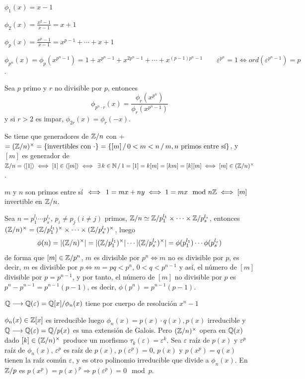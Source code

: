 \noindent$\phi_1(x) = x-1$

\noindent$\phi_2(x) = \frac{x^2-1}{x-1} = x+1$

\noindent$\phi_p(x) = \frac{x^p-1}{x-1} = x^{p-1} + \cdots  + x+ 1$

\noindent$\phi_{p^n}(x) = \phi_p(x^{p^n-1} ) = 1+x^{p^n-1} + x^{2p^n-1} + \cdots + x^{(p-1) p^n-1} \qquad \varepsilon^{p^n} = 1 \iff ord(\varepsilon^{p^n-1}) = p$.
\begin{ejer}
    Sea $p$ primo y $r$ no divisible por $p$, entonces 
    $$\phi_{p^n\cdot r}(x) = \frac{\phi_r(x^{p^n})}{\phi_r(x^{p^n-1})} $$
    y si $r>2$ es impar, $\phi_{2r}(x) = \phi_r(-x)$.
\end{ejer} 
Se tiene que generadores de $\mathbb{Z}/n$ con + $=(\mathbb{Z}/n)^{\times} = \{\text{invertibles con } \cdot\} = \{ [m] \, / \, 0 < m <n \, / \, m, n \text{ primos entre s\'i}\}$, y $[m]$ es generador de $\mathbb{Z}/n = \langle [1] \rangle \iff [1]\in \langle [m]\rangle \iff \, \exists\, k \in \mathbb{N} \, / \, 1=[1]=k[m]=[km]=[k][m]\iff [m] \in (\mathbb{Z}/n)^{\times}$.
\begin{lem}
    [de Bezout] $m$ y $n$ son primos entre s\'i $\iff \, 1=mx+ny \iff 1=mx \mod n\mathbb{Z} \iff [m]$ invertible en $\mathbb{Z}/n$.
\end{lem}
Sea $n = p_1^{l_1} \cdots p_s^{l_s}$, $p_i \neq p_j (i \neq j)$ primos, $\mathbb{Z}/n \simeq \mathbb{Z} /  p_1^{l_1} \times \cdots \times  \mathbb{Z}/p_s^{l_s}$, entonces $(\mathbb{Z} / n)^{\times} =(\mathbb{Z} /  p_1^{l_1}) ^{\times}\times \cdots \times  (\mathbb{Z}/p_s^{l_s})^{\times}$, luego
$$\phi(n) = |(\mathbb{Z} / n)^{\times}| =|(\mathbb{Z} /  p_1^{l_1}) ^{\times}|  \cdots |(\mathbb{Z}/p_s^{l_s})^{\times}| = \phi( p_1^{l_1}) \cdots  \phi(p_s^{l_s})$$
de forma que $[m]\in \mathbb{Z}/p^n$, $m$ es divisible por $p^n \iff m$ no es divisible por $p$, es decir, $m$ es divisible por $p\iff m = pq < p^n, \, 0< q< p^{n-1}$ y as\'i, el n\'umero de $[m]$ divisible por $p = p^{n-1}$, y por tanto, el n\'umero de $[m]$ no divisible por $p$ es $p^n-p^{n-1} = p^{n-1}(p-1)$, es decir, $\phi(p^n) = p^{n-1} (p-1)$. 
\begin{prop}
    $\mathbb{Q} \longrightarrow \mathbb{Q}(\varepsilon) = \mathbb{Q}[x] / \phi_n(x)$ tiene por cuerpo de resoluci\'on $x^n-1$
\end{prop}
\begin{dem}
    $\phi_n(x) \in \mathbb{Z}[x]$ es irreducible luego $\phi_n(x) = p(x)\cdot q(x), p(x)$ irreducible y $\mathbb{Q} \longrightarrow \mathbb{Q}(\varepsilon) = \mathbb{Q}/ p(x)$ es una extensi\'on de Galois. Pero $(\mathbb{Z}/n)^{\times}$ opera en $\mathbb{Q}(x)$ dado $[k]\in (\mathbb{Z}/n)^{\times}$ produce un morfismo $\tau_k (\varepsilon) = \varepsilon^k$. Sea $\varepsilon$ ra\'iz de $p(x)$ y $\varepsilon^p$ ra\'iz de $\phi_n(x)$, $\varepsilon^p$ es ra\'iz de $p(x)$, $p(\varepsilon^p)=0$, $p(x)$ y $p(x^p)=q(x)$ tienen la ra\'iz com\'un $\varepsilon$, y es otro polinomio irreducible que divide a $\phi_n(x)$. En $\mathbb{Z}/p$ es $p(x^p) = p(x)^p \Rightarrow p(\varepsilon^p) = 0 \mod p$.  
\end{dem}
